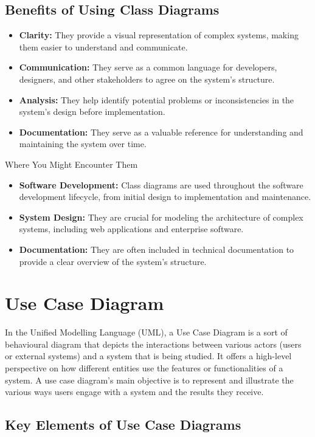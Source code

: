 \subsection{Benefits of Using Class Diagrams}
\begin{itemize}
    \item \textbf{Clarity:} They provide a visual representation of complex systems, making them easier to understand and communicate.
    \item \textbf{Communication:} They serve as a common language for developers, designers, and other stakeholders to agree on the system’s structure.
    \item \textbf{Analysis:} They help identify potential problems or inconsistencies in the system’s design before implementation.
    \item \textbf{Documentation:} They serve as a valuable reference for understanding and maintaining the system over time.
\end{itemize}

Where You Might Encounter Them
\begin{itemize}
    \item \textbf{Software Development:} Class diagrams are used throughout the software development lifecycle, from initial design to implementation and maintenance.
    \item \textbf{System Design:} They are crucial for modeling the architecture of complex systems, including web applications and enterprise software.
    \item \textbf{Documentation:} They are often included in technical documentation to provide a clear overview of the system’s structure.
\end{itemize}
\section{Use Case Diagram}
In the Unified Modelling Language (UML), a Use Case Diagram is a sort of behavioural diagram that depicts the interactions between various actors (users or external systems) and a system that is being studied. It offers a high-level perspective on how different entities use the features or functionalities of a system. A use case diagram’s main objective is to represent and illustrate the various ways users engage with a system and the results they receive.
\subsection{Key Elements of Use Case Diagrams}

